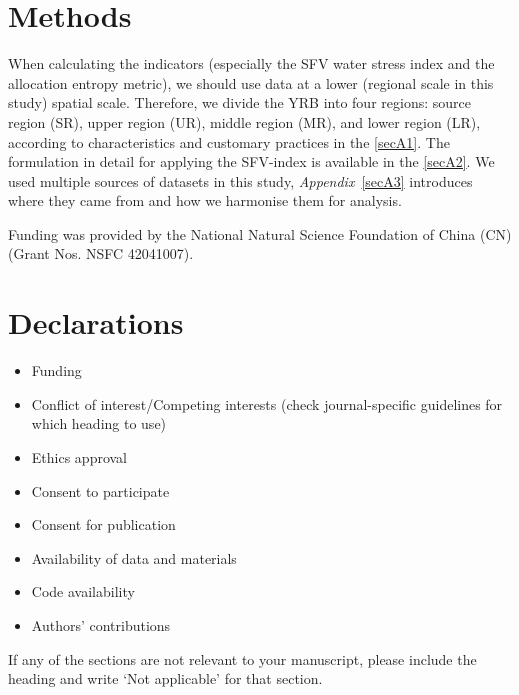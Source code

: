\documentclass[default,iicol,lineno]{sn-jnl}%
\theoremstyle{thmstyleone}%
\theoremstyle{thmstyletwo}%
\theoremstyle{thmstylethree}%
\begin{document}
\section{Methods}\label{sec11}


\backmatter

When calculating the indicators (especially the SFV water stress index and the allocation entropy metric), we should use data at a lower (regional scale in this study) spatial scale. Therefore, we divide the YRB into four regions: source region (SR), upper region (UR), middle region (MR), and lower region (LR), according to characteristics and customary practices in the \ref{secA1}.
The formulation in detail for applying the SFV-index is available in the \ref{secA2}.
We used multiple sources of datasets in this study, \textit{Appendix}~\ref{secA3} introduces where they came from and how we harmonise them for analysis.


Funding was provided by the National Natural Science Foundation of China (CN) (Grant Nos. NSFC 42041007).


\section*{Declarations}


\begin{itemize}
\item Funding
\item Conflict of interest/Competing interests (check journal-specific guidelines for which heading to use)
\item Ethics approval
\item Consent to participate
\item Consent for publication
\item Availability of data and materials
\item Code availability
\item Authors' contributions
\end{itemize}

\noindent
If any of the sections are not relevant to your manuscript, please include the heading and write `Not applicable' for that section.
\end{document}

